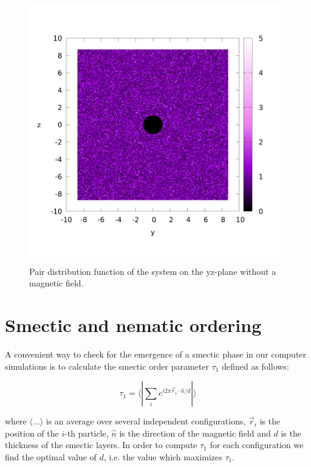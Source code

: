 \documentclass{article}
\begin{document}
\begin{figure}
    \centering
    \includegraphics[width=1\columnwidth]{gyz_noB.png}
    \caption{Pair distribution function of the system on the yz-plane without a magnetic field.}
    \label{fig:gyz_noB}
\end{figure}

\newpage

\section{Smectic and nematic ordering}

A convenient way to check for the emergence of a smectic phase in our computer simulations 
is to calculate the smectic order parameter $\tau_1$ defined as follows:

\begin{equation}
    \tau_1 = \langle | \sum_i e^{i 2\pi \vec{r}_i \cdot \hat{n} / d } |\rangle 
\end{equation}

where $\langle\ldots\rangle$ is an average over several independent configurations, $\vec{r}_i$ is the position of the $i$-th particle, $\hat{n}$ is the direction of the magnetic
field and $d$ is the thickness of the smectic layers.
In order to compute $\tau_1$ for each configuration we find the optimal value of $d$, i.e. 
the value which maximizes $\tau_1$.
\end{document}
